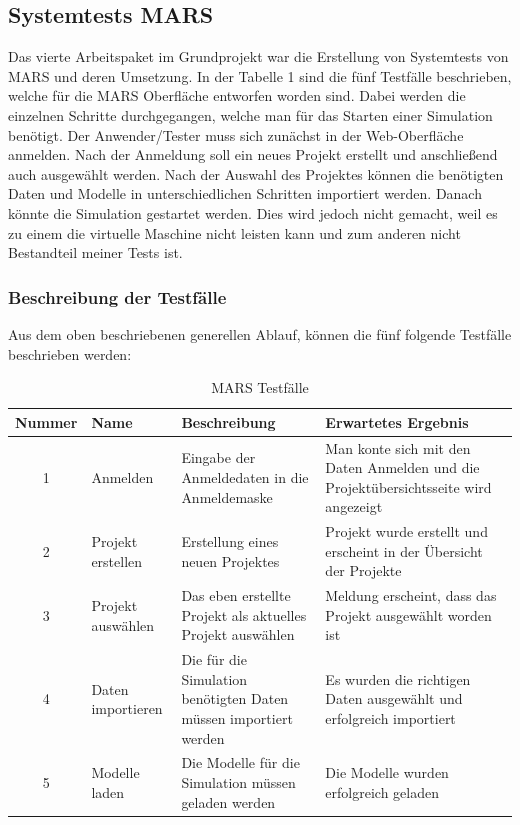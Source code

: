 \documentclass{llncs}
\begin{document}
\subsection{Systemtests MARS}
Das vierte Arbeitspaket im Grundprojekt war die Erstellung von Systemtests von MARS und deren Umsetzung. In der Tabelle 1 sind die fünf Testfälle beschrieben, welche für die MARS Oberfläche entworfen worden sind. Dabei werden die einzelnen Schritte durchgegangen, welche man für das Starten einer Simulation benötigt. Der Anwender/Tester muss sich zunächst in der Web-Oberfläche anmelden. Nach der Anmeldung soll ein neues Projekt erstellt und anschließend auch ausgewählt werden. Nach der Auswahl des Projektes können die benötigten Daten und Modelle in unterschiedlichen Schritten importiert werden. Danach könnte die Simulation gestartet werden. Dies wird jedoch nicht gemacht, weil es zu einem die virtuelle Maschine nicht leisten kann und zum anderen nicht Bestandteil meiner Tests ist. 
\subsubsection{Beschreibung der Testfälle}

Aus dem oben beschriebenen generellen Ablauf, können die fünf folgende Testfälle beschrieben werden:
\begin{table}[]
\centering
\label{MARS_Testfaelle}
\begin{tabular}{|c|l|p{4cm}|p{4cm}|}
\hline
\multicolumn{1}{|l|}{Nummer} & Name              & Beschreibung & Erwartetes Ergebnis \\ \hline
1 & Anmelden          & Eingabe der Anmeldedaten in die Anmeldemaske & Man konte sich mit den Daten Anmelden und die Projektübersichtsseite wird angezeigt \\ \hline
2 & Projekt erstellen & Erstellung eines neuen Projektes & Projekt wurde erstellt und erscheint in der Übersicht der Projekte \\ \hline
3 & Projekt auswählen & Das eben erstellte Projekt als aktuelles Projekt auswählen & Meldung erscheint, dass das Projekt ausgewählt worden ist  \\ \hline
4 & Daten importieren & Die für die Simulation benötigten Daten müssen importiert werden & Es wurden die richtigen Daten ausgewählt und erfolgreich importiert  \\ \hline
5 & Modelle laden     & Die Modelle für die Simulation müssen geladen werden & Die Modelle wurden erfolgreich geladen \\ \hline
\end{tabular}
\caption{MARS Testfälle}
\end{table}
\end{document}
